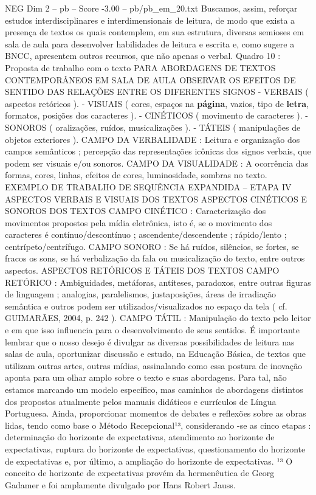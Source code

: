 \begin{textsample}{NEG Dim 2 – pb – Score -3.00 – pb/pb\_em\_20.txt}
Buscamos, assim, reforçar estudos interdisciplinares e interdimensionais de leitura, de modo que exista a presença de textos os quais contemplem, em sua estrutura, diversas semioses em sala de aula para desenvolver habilidades de leitura e escrita e, como sugere a BNCC, apresentem outros recursos, que não apenas o verbal.
Quadro 10 : Proposta de trabalho com o texto PARA ABORDAGENS DE TEXTOS CONTEMPORÂNEOS EM SALA DE AULA OBSERVAR OS EFEITOS DE SENTIDO DAS RELAÇÕES ENTRE OS DIFERENTES SIGNOS - VERBAIS ( aspectos retóricos ). - VISUAIS ( cores, espaços na \textbf{página}, vazios, tipo de \textbf{letra}, formatos, posições dos caracteres ). - CINÉTICOS ( movimento de caracteres ). - SONOROS ( oralizações, ruídos, musicalizações ). - TÁTEIS ( manipulações de objetos exteriores ).
CAMPO DA VERBALIDADE : Leitura e organização dos campos semânticos ; percepção das representações icônicas dos signos verbais, que podem ser visuais e/ou sonoros.
CAMPO DA VISUALIDADE : A ocorrência das formas, cores, linhas, efeitos de cores, luminosidade, sombras no texto.
EXEMPLO DE TRABALHO DE SEQUÊNCIA EXPANDIDA – ETAPA IV ASPECTOS VERBAIS E VISUAIS DOS TEXTOS ASPECTOS CINÉTICOS E SONOROS DOS TEXTOS CAMPO CINÉTICO : Caracterização dos movimentos propostos pela mídia eletrônica, isto é, se o movimento dos caracteres é contínuo/descontínuo ; ascendente/descendente ; rápido/lento ; centrípeto/centrífugo.
CAMPO SONORO : Se há ruídos, silêncios, se fortes, se fracos os sons, se há verbalização da fala ou musicalização do texto, entre outros aspectos.
ASPECTOS RETÓRICOS E TÁTEIS DOS TEXTOS CAMPO RETÓRICO : Ambiguidades, metáforas, antíteses, paradoxos, entre outras figuras de linguagem ; analogias, paralelismos, justaposições, áreas de irradiação semântica e outros podem ser utilizados/visualizados no espaço da tela ( cf.
GUIMARÃES, 2004, p. 242 ).
CAMPO TÁTIL : Manipulação do texto pelo leitor e em que isso influencia para o desenvolvimento de seus sentidos.
É importante lembrar que o nosso desejo é divulgar as diversas possibilidades de leitura nas salas de aula, oportunizar discussão e estudo, na Educação Básica, de textos que utilizam outras artes, outras mídias, assinalando como essa postura de inovação aponta para um olhar amplo sobre o texto e suas abordagens.
Para tal, não estamos marcando um modelo específico, mas caminhos de abordagens distintos dos propostos atualmente pelos manuais didáticos e currículos de Língua Portuguesa.
Ainda, proporcionar momentos de debates e reflexões sobre as obras lidas, tendo como base o Método Recepcional¹³, considerando -se as cinco etapas : determinação do horizonte de expectativas, atendimento ao horizonte de expectativas, ruptura do horizonte de expectativas, questionamento do horizonte de expectativas e, por último, a ampliação do horizonte de expectativas. ¹³ O conceito de horizonte de expectativas provém da hermenêutica de Georg Gadamer e foi amplamente divulgado por Hans Robert Jauss.

\end{textsample}
